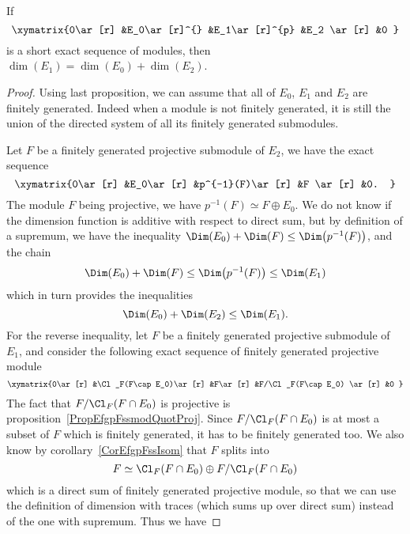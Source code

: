 \begin{proposition}
If
\begin{equation}
	\xymatrix{%
   0\ar[r] 	&E_0\ar[r]^{}	&E_1\ar[r]^{p}	&E_2 \ar[r]	&0
}
\end{equation}
is a short exact sequence of modules, then $\dim(E_1)=\dim(E_0)+\dim(E_2)$.
\end{proposition}

\begin{proof}
Using last proposition, we can assume that all of $E_0$, $E_1$ and $E_2$ are finitely generated. Indeed when a module is not finitely generated, it is still the union of the directed system of all its finitely generated submodules.

Let $F$ be a finitely generated projective submodule of $E_2$, we have the exact sequence
\begin{equation}
	\xymatrix{%
   0\ar[r] 	&E_0\ar[r]	&p^{-1}(F)\ar[r]	&F \ar[r]	&0.
}
\end{equation}
The module $F$ being projective, we have $p^{-1}(F)\simeq F\oplus E_0$. We do not know if the dimension function is additive with respect to direct sum, but by definition of a supremum, we have the inequality $\Dim(E_0)+\Dim(F)\leq \Dim\big( p^{-1}(F) \big)$, and the chain
\begin{equation}
	\Dim(E_0)+\Dim(F)\leq \Dim\big( p^{-1}(F) \big)\leq\Dim(E_1)
\end{equation}
which in turn provides the inequalities
\begin{equation}
	\Dim(E_0)+\Dim(E_2)\leq\Dim(E_1).
\end{equation}
For the reverse inequality, let $F$ be a finitely generated projective submodule of $E_1$, and consider the following exact sequence of finitely generated projective module
\begin{equation}
	\xymatrix{%
   0\ar[r] 	&\Cl_F(F\cap E_0)\ar[r]	&F\ar[r]	&F/\Cl_F(F\cap E_0) \ar[r]	&0
}
\end{equation}
The fact that $F/\Cl_F(F\cap E_0)$ is projective is proposition~\ref{PropEfgpFssmodQuotProj}. Since $F/\Cl_F(F\cap E_0)$ is at most a subset of $F$ which is finitely generated, it has to be finitely generated too. We also know by corollary~\ref{CorEfgpFssIsom} that $F$ splits into
\begin{equation}
	F\simeq \Cl_F(F\cap E_0)\oplus F/\Cl_F(F\cap E_0)
\end{equation}
which is a direct sum of finitely generated projective module, so that we can use the definition of dimension with traces (which sums up over direct sum) instead of the one with supremum. Thus we have

\end{proof}
